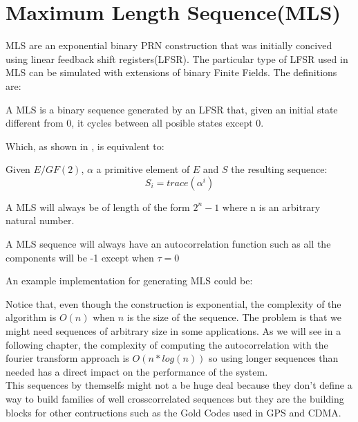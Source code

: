 \section{Maximum Length Sequence(MLS)}

MLS are an exponential binary PRN construction that was initially concived
using linear feedback shift registers(LFSR). The particular type of LFSR used
in MLS can be simulated with extensions of binary Finite Fields. The
definitions are:

\begin{definition}[LFSR]
  A MLS is a binary sequence generated by an LFSR that, given an initial state
  different from 0, it cycles between all posible states except 0.
\end{definition}

Which, as shown in \citet{golomb_ref}, is equivalent to:

\begin{definition}
  Given $E/GF(2)$, $\alpha$ a primitive element of $E$ and $S$ the resulting
  sequence:
  \begin{equation}
    S_{i} = trace(\alpha^{i})
  \end{equation}
\end{definition}

\begin{property}
  A MLS will always be of length of the form $2^{n}-1$ where n is an arbitrary
  natural number.
\end{property}

\begin{property}
  A MLS sequence will always have an autocorrelation function such as all the
  components will be -1 except when $\tau = 0$
\end{property}

An example implementation for generating MLS could be:


Notice that, even though the construction is exponential, the complexity of
the algorithm is $O(n)$ when $n$ is the size of the sequence. The problem is
that we might need sequences of arbitrary size in some applications. As we will
see in a following chapter, the complexity of computing the autocorrelation
with the fourier transform approach is $O(n*log(n))$ so using longer sequences
than needed has a direct impact on the performance of the system. \\

This sequences by themselfs might not a be huge deal because they don't define
a way to build families of well crosscorrelated sequences but they are the
building blocks for other contructions such as the Gold Codes used in GPS and
CDMA.
